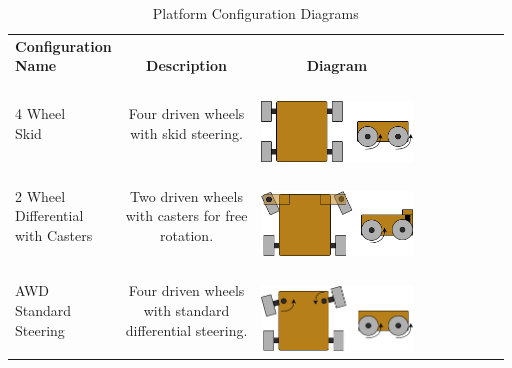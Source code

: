 \documentclass[12pt]{extarticle}
\begin{document}
     \begin{table}[H]
		
		
		\caption{Platform Configuration Diagrams}
		\label{PlatformConfigDiagramsTable}
		\begin{adjustwidth}{-1in}{-1in}
		\centering
		\setlength{\dashlinedash}{.5pt}
		\setlength\tabcolsep{4pt}
		\def\arraystretch{1.9}
		

		\begin{tabular}{lcccccccc}
		\hline
        \makecell{\textbf{Configuration}\\ \textbf{Name}} & \makecell{\\ \textbf{Description}} & \makecell{\\ \textbf{Diagram}}  \\ 
		\makecell[l]{4 Wheel \\ Skid} &  \makecell[l]{Four driven wheels \\ with skid steering.} &  \makecell[l]{\\ \includegraphics[width=4cm]{4_wheel_skid}} \\  
		\makecell[l]{2 Wheel \\ Differential \\ with Casters} &  \makecell[l]{Two driven wheels \\ with casters for free \\ rotation.} &  \makecell[l]{\\ \includegraphics[width=4cm]{2_wheel_diff}} \\
		\makecell[l]{AWD \\ Standard \\ Steering} &  \makecell[l]{Four driven wheels \\ with standard \\differential steering.} &  \makecell[l]{\\ \includegraphics[width=4cm]{awd_standard_steer}} \\

\end{tabular}
\end{adjustwidth}
\end{table}
\end{document}
